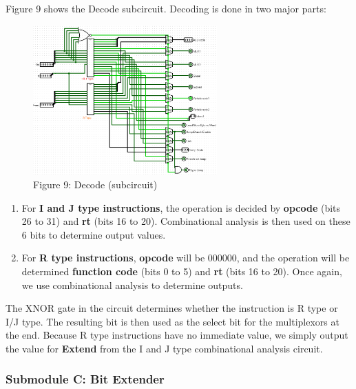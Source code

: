 \documentclass{article}
\begin{document}
\noindent Figure 9 shows the Decode subcircuit. Decoding is done in two major parts: \vspace{-1cm}\\
\begin{figure}
\vspace{-.1cm}
\begin{center}
\includegraphics[width=0.63\textwidth]{Decoder.png} \\
Figure 9: Decode (subcircuit)
\end{center}
\vspace{-2cm}
\end{figure}
\begin{enumerate}
\item
For \textbf{I and J type instructions}, the operation is decided by \textbf{opcode} (bits 26 to 31) and \textbf{rt} (bits 16 to 20). Combinational analysis is then used on these 6 bits to determine output values.

\item
For \textbf{R type instructions}, \textbf{opcode} will be 000000, and the operation will be determined \textbf{function code} (bits 0 to 5) and \textbf{rt} (bits 16 to 20). Once again, we use combinational analysis to determine outputs.
\end{enumerate}
The XNOR gate in the circuit determines whether the instruction is R type or I/J type. The resulting bit is then used as the select bit for the multiplexors at the end. Because R type instructions have no immediate value, we simply output the value for \textbf{Extend} from the I and J type combinational analysis circuit.

\newpage

\subsubsection{Submodule C: Bit Extender}
\end{document}
